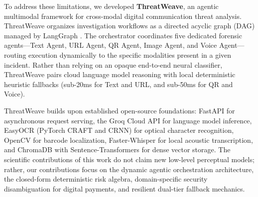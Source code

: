 \documentclass[conference]{IEEEtran}
\begin{document}
To address these limitations, we developed \textbf{ThreatWeave}, an agentic multimodal framework for cross-modal digital communication threat analysis. ThreatWeave organizes investigation workflows as a directed acyclic graph (DAG) managed by LangGraph \cite{hong2024metagpt, wu2023autogen}. The orchestrator coordinates five dedicated forensic agents—Text Agent, URL Agent, QR Agent, Image Agent, and Voice Agent—routing execution dynamically to the specific modalities present in a given incident. Rather than relying on an opaque end-to-end neural classifier, ThreatWeave pairs cloud language model reasoning with local deterministic heuristic fallbacks (sub-20ms for Text and URL, and sub-50ms for QR and Voice).

ThreatWeave builds upon established open-source foundations: FastAPI for asynchronous request serving, the Groq Cloud API for language model inference, EasyOCR (PyTorch CRAFT and CRNN) for optical character recognition, OpenCV for barcode localization, Faster-Whisper for local acoustic transcription, and ChromaDB with Sentence-Transformers for dense vector storage. The scientific contributions of this work do not claim new low-level perceptual models; rather, our contributions focus on the dynamic agentic orchestration architecture, the closed-form deterministic risk algebra, domain-specific security disambiguation for digital payments, and resilient dual-tier fallback mechanics.
\end{document}
